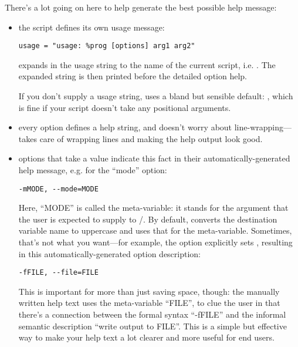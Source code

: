 There's a lot going on here to help  generate the
best possible help message:

\begin{itemize}
\item the script defines its own usage message:

\begin{verbatim}
usage = "usage: %prog [options] arg1 arg2"
\end{verbatim}

 expands  in the usage string to the name of the
current script, i.e. .  The
expanded string is then printed before the detailed option help.

If you don't supply a usage string,  uses a bland but
sensible default: , which is fine if your
script doesn't take any positional arguments.

\item every option defines a help string, and doesn't worry about 
line-wrapping--- takes care of wrapping lines and 
making the help output look good.

\item options that take a value indicate this fact in their
automatically-generated help message, e.g. for the ``mode'' option:

\begin{verbatim}
-mMODE, --mode=MODE
\end{verbatim}

Here, ``MODE'' is called the meta-variable: it stands for the argument
that the user is expected to supply to
/.  By default, 
converts the destination variable name to uppercase and uses that for
the meta-variable.  Sometimes, that's not what you want---for
example, the  option explicitly sets
, resulting in this automatically-generated
option description:

\begin{verbatim}
-fFILE, --file=FILE
\end{verbatim}

This is important for more than just saving space, though: the
manually written help text uses the meta-variable ``FILE'', to clue
the user in that there's a connection between the formal syntax
``-fFILE'' and the informal semantic description ``write output to
FILE''.  This is a simple but effective way to make your help text a
lot clearer and more useful for end users.
\end{itemize}

